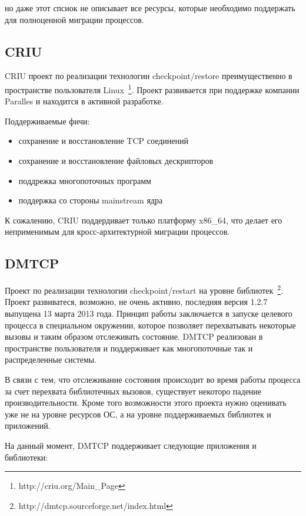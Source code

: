 но даже этот спсиок не описывает все ресурсы, которые необходимо поддержать для полноценной миграции процессов.

\subsection{CRIU}

CRIU проект по реализации технологии checkpoint/restore преимущественно в пространстве пользователя Linux~\footnote{http://criu.org/Main\_Page}. Проект развивается при поддержке компании Paralles и находится в активной разработке.

Поддерживаемые фичи:

\begin{itemize}

    \item сохранение и восстановление TCP соединений
    \item сохранение и восстановление файловых дескрипторов
    \item поддрежка многопоточных программ
    \item поддержка со стороны mainstream ядра

\end{itemize}

К сожалению, CRIU поддердивает только платформу x86\_64, что делает его неприменимым для кросс-архитектурной миграции процессов.

\subsection{DMTCP}

Проект по реализации технологии checkpoint/restart на уровне библиотек~\footnote{http://dmtcp.sourceforge.net/index.html}. Проект развиватеся, возможно, не очень активно, последняя версия 1.2.7 выпущена 13 марта 2013 года. Принцип работы заключается в запуске целевого процесса в специальном окружении, которое позволяет перехватывать некоторые вызовы и таким образом отслеживать состояние. DMTCP реализован в пространстве пользователя и поддерживает как многопоточные так и распределенные системы.

В связи с тем, что отслеживание состояния происходит во время работы процесса за счет перехвата библиотечных вызовов, существует некоторо падение производительности. Кроме того возможности этого проекта нужно оценивать уже не на уровне ресурсов ОС, а на уровне поддерживаемых библиотек и приложений.

На данный момент, DMTCP поддерживает следующие приложения и библиотеки:

